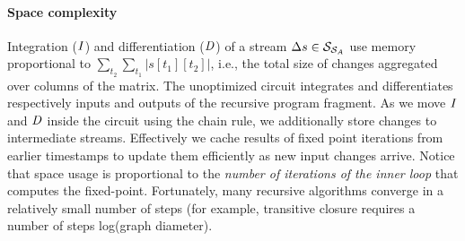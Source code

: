 \paragraph{Space complexity} Integration ($\mathit{I}$) and differentiation ($\mathit{D}$) of a
stream $\Delta s \in \mathcal{S}_{\mathcal{S}_{A}}$ use memory proportional to
$\sum_{t_2}\sum_{t_1}|s[t_1][t_2]|$, i.e., the total size of changes
aggregated over columns of the matrix.  The unoptimized circuit integrates
and differentiates respectively inputs and outputs of the recursive program
fragment.  As we move $\mathit{I}$ and $\mathit{D}$ inside the circuit using the chain rule, we
additionally store changes to intermediate streams.  Effectively we cache results of 
fixed point iterations from earlier timestamps to update them efficiently as new input changes arrive.
Notice that space usage is proportional to the \emph{number of iterations of the inner loop} 
that computes the fixed-point.  
Fortunately, many recursive algorithms converge in a relatively small number of steps
(for example, transitive closure requires a number of steps  log(graph diameter).



